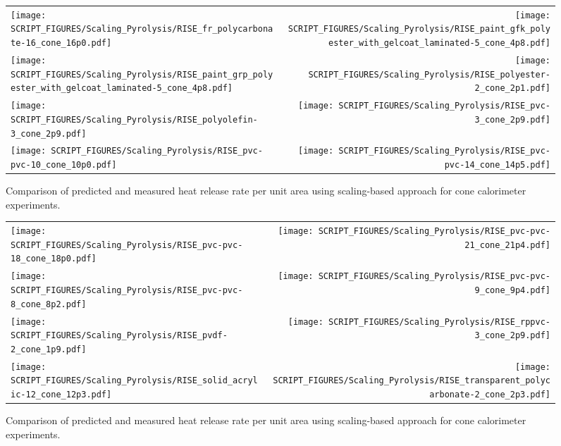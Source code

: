 \begin{figure}[p]
\begin{tabular*}{\textwidth}{l@{\extracolsep{\fill}}r}
\texttt{[image: SCRIPT\_FIGURES/Scaling\_Pyrolysis/RISE\_fr\_polycarbonate-16\_cone\_16p0.pdf]} &
\texttt{[image: SCRIPT\_FIGURES/Scaling\_Pyrolysis/RISE\_paint\_gfk\_polyester\_with\_gelcoat\_laminated-5\_cone\_4p8.pdf]} \\
\texttt{[image: SCRIPT\_FIGURES/Scaling\_Pyrolysis/RISE\_paint\_grp\_polyester\_with\_gelcoat\_laminated-5\_cone\_4p8.pdf]} &
\texttt{[image: SCRIPT\_FIGURES/Scaling\_Pyrolysis/RISE\_polyester-2\_cone\_2p1.pdf]} \\
\texttt{[image: SCRIPT\_FIGURES/Scaling\_Pyrolysis/RISE\_polyolefin-3\_cone\_2p9.pdf]} &
\texttt{[image: SCRIPT\_FIGURES/Scaling\_Pyrolysis/RISE\_pvc-3\_cone\_2p9.pdf]} \\
\texttt{[image: SCRIPT\_FIGURES/Scaling\_Pyrolysis/RISE\_pvc-pvc-10\_cone\_10p0.pdf]} &
\texttt{[image: SCRIPT\_FIGURES/Scaling\_Pyrolysis/RISE\_pvc-pvc-14\_cone\_14p5.pdf]} \\
\end{tabular*}
\caption[HRRPUA of RISE Materials using scaling model , Polymers materials]
{Comparison of predicted and measured heat release rate per unit area using scaling-based approach for cone calorimeter experiments.}
\label{RISE_Materials_HRR_Polymers}
\end{figure}

\begin{figure}[p]
\begin{tabular*}{\textwidth}{l@{\extracolsep{\fill}}r}
\texttt{[image: SCRIPT\_FIGURES/Scaling\_Pyrolysis/RISE\_pvc-pvc-18\_cone\_18p0.pdf]} &
\texttt{[image: SCRIPT\_FIGURES/Scaling\_Pyrolysis/RISE\_pvc-pvc-21\_cone\_21p4.pdf]} \\
\texttt{[image: SCRIPT\_FIGURES/Scaling\_Pyrolysis/RISE\_pvc-pvc-8\_cone\_8p2.pdf]} &
\texttt{[image: SCRIPT\_FIGURES/Scaling\_Pyrolysis/RISE\_pvc-pvc-9\_cone\_9p4.pdf]} \\
\texttt{[image: SCRIPT\_FIGURES/Scaling\_Pyrolysis/RISE\_pvdf-2\_cone\_1p9.pdf]} &
\texttt{[image: SCRIPT\_FIGURES/Scaling\_Pyrolysis/RISE\_rppvc-3\_cone\_2p9.pdf]} \\
\texttt{[image: SCRIPT\_FIGURES/Scaling\_Pyrolysis/RISE\_solid\_acrylic-12\_cone\_12p3.pdf]} &
\texttt{[image: SCRIPT\_FIGURES/Scaling\_Pyrolysis/RISE\_transparent\_polycarbonate-2\_cone\_2p3.pdf]} \\
\end{tabular*}
\caption[HRRPUA of RISE Materials using scaling model , Polymers materials]
{Comparison of predicted and measured heat release rate per unit area using scaling-based approach for cone calorimeter experiments.}
\label{RISE_Materials_HRR_Polymers}
\end{figure}

